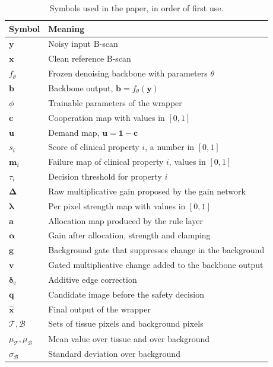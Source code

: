 \begin{table}[!tb]
\centering
\caption{Symbols used in the paper, in order of first use.}
\label{tab:notation}
\setlength{\tabcolsep}{4pt}
\setlength{\aboverulesep}{0pt}
\setlength{\belowrulesep}{0pt}
\renewcommand{\arraystretch}{0.95}
\scriptsize
\begin{tabular}{lp{}}
\toprule
Symbol & Meaning \\
\midrule
$\mathbf{y}$ & Noisy input B-scan \\
$\mathbf{x}$ & Clean reference B-scan \\
$f_\theta$ & Frozen denoising backbone with parameters $\theta$ \\
$\mathbf{b}$ & Backbone output, $\mathbf{b} = f_\theta(\mathbf{y})$ \\
$\phi$ & Trainable parameters of the wrapper \\
$\mathbf{c}$ & Cooperation map with values in $[0,1]$ \\
$\mathbf{u}$ & Demand map, $\mathbf{u} = \mathbf{1} - \mathbf{c}$ \\
$s_i$ & Score of clinical property $i$, a number in $[0,1]$ \\
$\mathbf{m}_i$ & Failure map of clinical property $i$, values in $[0,1]$ \\
$\tau_i$ & Decision threshold for property $i$ \\
$\boldsymbol{\Delta}$ & Raw multiplicative gain proposed by the gain network \\
$\boldsymbol{\lambda}$ & Per pixel strength map with values in $[0,1]$ \\
$\mathbf{a}$ & Allocation map produced by the rule layer \\
$\boldsymbol{\alpha}$ & Gain after allocation, strength and clamping \\
$\mathbf{g}$ & Background gate that suppresses change in the background \\
$\mathbf{v}$ & Gated multiplicative change added to the backbone output \\
$\boldsymbol{\delta}_{\mathrm{e}}$ & Additive edge correction \\
$\mathbf{q}$ & Candidate image before the safety decision \\
$\hat{\mathbf{x}}$ & Final output of the wrapper \\
$\mathcal{T},\mathcal{B}$ & Sets of tissue pixels and background pixels \\
$\mu_\mathcal{T},\mu_\mathcal{B}$ & Mean value over tissue and over background \\
$\sigma_\mathcal{B}$ & Standard deviation over background \\
\bottomrule
\end{tabular}
\end{table}




